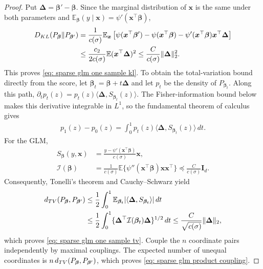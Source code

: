 \documentclass[letterpaper,12pt]{article}
\numberwithin{equation}{section}
\theoremstyle{plain}
\numberwithin{Theorem}{section}
\numberwithin{proposition}{section}
\numberwithin{Lemma}{section}
{
	\theoremstyle{definition}
	\newtheorem{Definition}{Definition}
	\newtheorem{example}{Example}
	\numberwithin{example}{section}
	\newtheorem{fact}{Fact}
	\numberwithin{fact}{section}
	\newtheorem{remark}{Remark}
}
\newcommand{\1}{\mathbbm{1}}
\def\bbeta{{\boldsymbol{\beta}}}
\def\E{\mathbb{E}}
\begin{document}
\begin{proof}
Put $\bm\Delta=\bbeta'-\bbeta$.  Since the marginal distribution of $\bm x$ is the same under both parameters and
$\E_\bbeta(y\mid\bm x)=\psi'(\bm x^\top\bbeta)$,
\begin{align*}
    D_{\rm KL}(P_{\bbeta}\|P_{\bbeta'})
    &=\frac1{c(\sigma)}
    \E_{\bm x}\left[
    \psi(\bm x^\top\bbeta')-\psi(\bm x^\top\bbeta)
    -\psi'(\bm x^\top\bbeta)\bm x^\top\bm\Delta
    \right]\\
    &\leq\frac{c_2}{2c(\sigma)}
    \E(\bm x^\top\bm\Delta)^2
    \leq\frac{C}{c(\sigma)}\|\bm\Delta\|_2^2.
\end{align*}
This proves \eqref{eq: sparse glm one sample kl}.  To obtain the total-variation bound directly from the score, let
$\bbeta_t=\bbeta+t\bm\Delta$ and let $p_t$ be the density of
$P_{\bbeta_t}$.  Along this path,
$\partial_t p_t(z)=p_t(z)\langle\bm\Delta,S_{\bbeta_t}(z)\rangle$.
The Fisher-information bound below makes this derivative integrable in
$L^1$, so the fundamental theorem of calculus gives
\begin{align*}
    p_1(z)-p_0(z)
    =\int_0^1p_t(z)\langle\bm\Delta,S_{\bbeta_t}(z)\rangle\,dt.
\end{align*}
For the GLM,
\begin{align*}
    S_{\bbeta}(y,\bm x)
    &=\frac{y-\psi'(\bm x^\top\bbeta)}{c(\sigma)}\bm x,\\
    \mathcal I(\bbeta)
    &=\frac1{c(\sigma)}\E\{\psi''(\bm x^\top\bbeta)
    \bm x\bm x^\top\}\preceq\frac{C}{c(\sigma)}\bm I_d.
\end{align*}
Consequently, Tonelli's theorem and Cauchy--Schwarz yield
\begin{align*}
    d_{\rm TV}(P_{\bbeta},P_{\bbeta'})
    &\leq\frac12\int_0^1
    \E_{\bbeta_t}|\langle\bm\Delta,S_{\bbeta_t}\rangle|\,dt\\
    &\leq\frac12\int_0^1
    \{\bm\Delta^\top\mathcal I(\bbeta_t)\bm\Delta\}^{1/2}\,dt
    \leq\frac{C}{\sqrt{c(\sigma)}}\|\bm\Delta\|_2,
\end{align*}
which proves \eqref{eq: sparse glm one sample tv}.  Couple the $n$ coordinate pairs independently by maximal couplings.  The expected number of unequal coordinates is $n\,d_{\rm TV}(P_{\bbeta},P_{\bbeta'})$, which proves
\eqref{eq: sparse glm product coupling}.
\end{proof}
\end{document}
